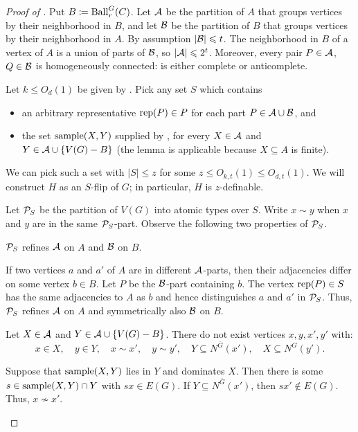 \begin{proof}[Proof of ]
    Put $B\coloneqq \Ball_r^G(C)$.
    Let $\AA$ be the partition of $A$ that groups vertices by their neighborhood in $B$, and let $\BB$ be the partition of $B$ that groups vertices by their neighborhood in $A$.
    By assumption $|\BB|\leq t$.
    The neighborhood in $B$ of a vertex of $A$ is a union of parts of $\BB$, so $|\AA|\leq2^t$.
    Moreover, every pair $P\in\AA$, $Q\in\BB$ is homogeneously connected: is either complete or anticomplete.

    Let $k \leq O_d(1)$ be given by .
    Pick any set $S$ which contains
    \begin{itemize}
        \item an arbitrary representative $\rep(P)\in P$ for each part $P\in\AA\cup\BB$, and
        \item
        the set $\sample(X,Y)$ supplied by , for every $X\in\AA$ and $Y\in\AA\cup\{V(G)\setminus B\}$         
        (the lemma is applicable because $X \subseteq A$ is finite).
    \end{itemize}
    We can pick such a set with $|S|\le z$ for some $z\le O_{k,t}(1)\le O_{d,t}(1)$.
    We will construct $H$ as an $S$-flip of $G$; in particular, $H$ is $z$-definable.
    
    Let $\PP_S$ be the partition of $V(G)$ into atomic types over $S$.
    Write $x\sim y$ when $x$ and $y$ are in the same $\PP_S$-part.
    Observe the following two properties of $\PP_S$.

    \begin{claim}
    $\PP_S$ refines $\AA$ on $A$ and $\BB$ on $B$.
    \end{claim}
    \begin{claimproof}
        If two vertices $a$ and $a'$ of $A$ are in different $\AA$-parts, then their adjacencies differ on some vertex $b \in B$.
        Let $P$ be the $\BB$-part containing $b$.
        The vertex $\rep(P) \in S$ has the same adjacencies to $A$ as $b$ and hence distinguishes $a$ and $a'$ in $\PP_S$.
        Thus, $\PP_S$ refines $\AA$ on $A$ and symmetrically also $\BB$ on $B$.
    \end{claimproof}

    \begin{claim}\label{clm:dagger}
    Let $X\in \AA$ and $Y\in \AA\cup\set{V(G)-B}$. 
    There do not exist vertices $x,y,x',y'$ with:
    \begin{equation*}\tag{$\dagger$}\label{eq:ball-flip-crossing}
        x\in X,\quad y\in Y,\quad x\sim x',\quad y\sim y',
        \quad Y\subseteq N^{\overline G}(x'),\quad X\subseteq N^G(y').
    \end{equation*}    
    \end{claim}
    \begin{claimproof}
    Suppose that $\sample(X,Y)$ lies in $Y$ and dominates $X$. 
    Then there is some  $s\in\sample(X,Y)\cap Y$ with $sx\in E(G)$.
    If
    $Y\subseteq N^{\overline G}(x')$,
then $sx'\notin E(G)$.
Thus, $x\nsim x'$.


\end{claimproof}
\end{proof}
